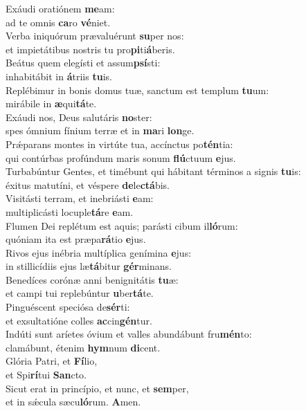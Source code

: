 \evenverse Exáudi oratiónem \textbf{me}am:~\*\\
\evenverse ad te omnis \textbf{ca}ro \textbf{vé}niet.\\
\oddverse Verba iniquórum prævaluérunt \textbf{su}per nos:~\*\\
\oddverse et impietátibus nostris tu pro\textbf{pi}ti\textbf{á}beris.\\
\evenverse Beátus quem elegísti et assum\textbf{psí}sti:~\*\\
\evenverse inhabitábit in \textbf{á}triis \textbf{tu}is.\\
\oddverse Replébimur in bonis domus tuæ, sanctum est templum \textbf{tu}um:~\*\\
\oddverse mirábile in \textbf{æ}qui\textbf{tá}te.\\
\evenverse Exáudi nos, Deus salutáris \textbf{no}ster:~\*\\
\evenverse spes ómnium fínium terræ et in \textbf{ma}ri \textbf{lon}ge.\\
\oddverse Prǽparans montes in virtúte tua, accínctus po\textbf{tén}tia:~\*\\
\oddverse qui contúrbas profúndum maris sonum \textbf{flú}ctuum \textbf{e}jus.\\
\evenverse Turbabúntur Gentes, et timébunt qui hábitant términos a signis \textbf{tu}is:~\*\\
\evenverse éxitus matutíni, et véspere \textbf{de}le\textbf{ctá}bis.\\
\oddverse Visitásti terram, et inebriásti \textbf{e}am:~\*\\
\oddverse multiplicásti locuple\textbf{tá}re \textbf{e}am.\\
\evenverse Flumen Dei replétum est aquis; parásti cibum il\textbf{ló}rum:~\*\\
\evenverse quóniam ita est præpa\textbf{rá}tio \textbf{e}jus.\\
\oddverse Rivos ejus inébria multíplica genímina \textbf{e}jus:~\*\\
\oddverse in stillicídiis ejus læ\textbf{tá}bitur \textbf{gér}minans.\\
\evenverse Benedíces corónæ anni benignitátis \textbf{tu}æ:~\*\\
\evenverse et campi tui replebúntur \textbf{u}ber\textbf{tá}te.\\
\oddverse Pinguéscent speciósa de\textbf{sér}ti:~\*\\
\oddverse et exsultatióne colles \textbf{ac}cin\textbf{gén}tur.\\
\evenverse Indúti sunt aríetes óvium et valles abundábunt fru\textbf{mén}to:~\*\\
\evenverse clamábunt, étenim \textbf{hym}num \textbf{di}cent.\\
\oddverse Glória Patri, et \textbf{Fí}lio,~\*\\
\oddverse et Spi\textbf{rí}tui \textbf{San}cto.\\
\evenverse Sicut erat in princípio, et nunc, et \textbf{sem}per,~\*\\
\evenverse et in sǽcula sæcu\textbf{ló}rum. \textbf{A}men.\\
